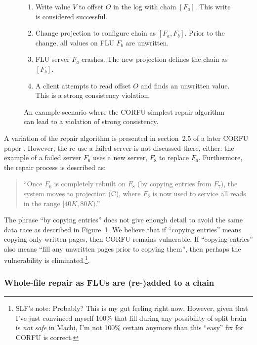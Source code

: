 \documentclass[preprint,10pt]{sigplanconf}
\begin{document}
\begin{figure}
\begin{enumerate}
\item Write value $V$ to offset $O$ in the log with chain $[F_a]$.
  This write is considered successful.
\item Change projection to configure chain as $[F_a,F_b]$.  Prior to
  the change, all values on FLU $F_b$ are unwritten.
\item FLU server $F_a$ crashes.  The new projection defines the chain
  as $[F_b]$.
\item A client attempts to read offset $O$ and finds an unwritten
  value.  This is a strong consistency violation.
\end{enumerate}
\caption{An example scenario where the CORFU simplest repair algorithm
  can lead to a violation of strong consistency.}
\label{fig:corfu-repair-sc-violation}
\end{figure}

A variation of the repair
algorithm is presented in section~2.5 of a later CORFU paper \cite{corfu2}.
However, the re-use a failed
server is not discussed there, either: the example of a failed server
$F_6$ uses a new server, $F_8$ to replace $F_6$.  Furthermore, the
repair process is described as:

\begin{quote}
``Once $F_6$ is completely rebuilt on $F_8$ (by copying entries from
  $F_7$), the system moves to projection (C), where $F_8$ is now used
  to service all reads in the range $[40K,80K)$.''
\end{quote}

The phrase ``by copying entries'' does not give enough
detail to avoid the same data race as described in
Figure~\ref{fig:corfu-repair-sc-violation}.  We believe that if
``copying entries'' means copying only written pages, then CORFU
remains vulnerable.  If ``copying entries'' also means ``fill any
unwritten pages prior to copying them'', then perhaps the
vulnerability is eliminated.\footnote{SLF's note: Probably?  This is my
  gut feeling right now.  However, given that I've just convinced
  myself 100\% that fill during any possibility of split brain is {\em
  not safe} in Machi, I'm not 100\% certain anymore than this ``easy''
  fix for CORFU is correct.}.

\subsubsection{Whole-file repair as FLUs are (re-)added to a chain}
\label{sub:repair-add-to-chain}
\end{document}
